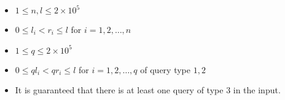 \begin{itemize}
\tightlist
\item $1 \leq n,l \leq 2 \times 10^5$
\item $0 \leq l_i < r_i \leq l$ for $i = 1,2,\ldots,n$
\item $1 \leq q \leq 2 \times 10^5$
\item $0 \leq ql_i < qr_i \leq l$ for $i = 1,2,\ldots,q$ of query type $1,2$
\item It is guaranteed that there is at least one query of type $3$ in the input.
\end{itemize}
